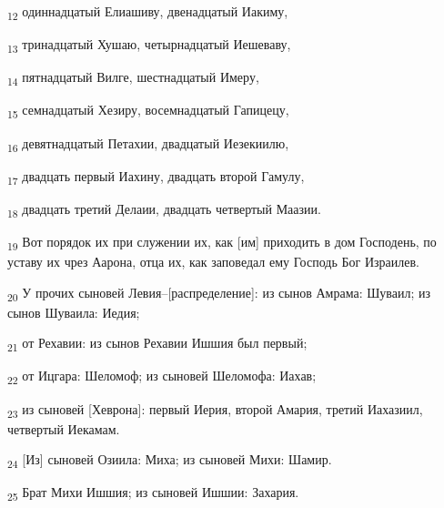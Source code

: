 \begin{tcolorbox}
\textsubscript{12} одиннадцатый Елиашиву, двенадцатый Иакиму,
\end{tcolorbox}
\begin{tcolorbox}
\textsubscript{13} тринадцатый Хушаю, четырнадцатый Иешеваву,
\end{tcolorbox}
\begin{tcolorbox}
\textsubscript{14} пятнадцатый Вилге, шестнадцатый Имеру,
\end{tcolorbox}
\begin{tcolorbox}
\textsubscript{15} семнадцатый Хезиру, восемнадцатый Гапицецу,
\end{tcolorbox}
\begin{tcolorbox}
\textsubscript{16} девятнадцатый Петахии, двадцатый Иезекиилю,
\end{tcolorbox}
\begin{tcolorbox}
\textsubscript{17} двадцать первый Иахину, двадцать второй Гамулу,
\end{tcolorbox}
\begin{tcolorbox}
\textsubscript{18} двадцать третий Делаии, двадцать четвертый Маазии.
\end{tcolorbox}
\begin{tcolorbox}
\textsubscript{19} Вот порядок их при служении их, как [им] приходить в дом Господень, по уставу их чрез Аарона, отца их, как заповедал ему Господь Бог Израилев.
\end{tcolorbox}
\begin{tcolorbox}
\textsubscript{20} У прочих сыновей Левия--[распределение]: из сынов Амрама: Шуваил; из сынов Шуваила: Иедия;
\end{tcolorbox}
\begin{tcolorbox}
\textsubscript{21} от Рехавии: из сынов Рехавии Ишшия был первый;
\end{tcolorbox}
\begin{tcolorbox}
\textsubscript{22} от Ицгара: Шеломоф; из сыновей Шеломофа: Иахав;
\end{tcolorbox}
\begin{tcolorbox}
\textsubscript{23} из сыновей [Хеврона]: первый Иерия, второй Амария, третий Иахазиил, четвертый Иекамам.
\end{tcolorbox}
\begin{tcolorbox}
\textsubscript{24} [Из] сыновей Озиила: Миха; из сыновей Михи: Шамир.
\end{tcolorbox}
\begin{tcolorbox}
\textsubscript{25} Брат Михи Ишшия; из сыновей Ишшии: Захария.
\end{tcolorbox}

